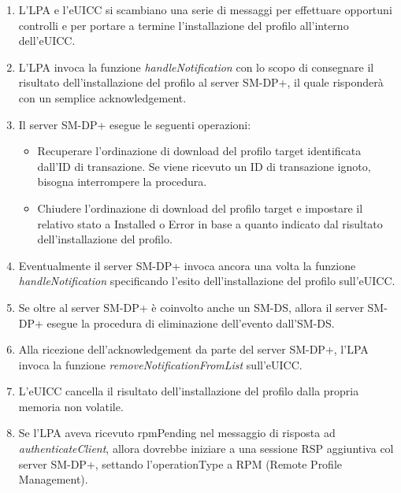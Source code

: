 \documentclass[10pt, oneside]{book}
\begin{document}
\begin{enumerate}
\item L'LPA e l'eUICC si scambiano una serie di messaggi per effettuare opportuni controlli e per portare a termine l'installazione del profilo all'interno dell'eUICC.
\item L'LPA invoca la funzione \textit{handleNotification} con lo scopo di consegnare il risultato dell'installazione del profilo al server SM-DP+, il quale risponderà con un semplice acknowledgement.
\item Il server SM-DP+ esegue le seguenti operazioni:
\begin{itemize}[itemsep=0pt]
\item Recuperare l'ordinazione di download del profilo target identificata dall'ID di transazione. Se viene ricevuto un ID di transazione ignoto, bisogna interrompere la procedura.
\item Chiudere l'ordinazione di download del profilo target e impostare il relativo stato a Installed o Error in base a quanto indicato dal risultato dell'installazione del profilo.
\end{itemize}
\item Eventualmente il server SM-DP+ invoca ancora una volta la funzione \textit{handleNotification} specificando l'esito dell'installazione del profilo sull'eUICC.
\item Se oltre al server SM-DP+ è coinvolto anche un SM-DS, allora il server SM-DP+ esegue la procedura di eliminazione dell'evento dall'SM-DS.
\item Alla ricezione dell'acknowledgement da parte del server SM-DP+, l'LPA invoca la funzione \textit{removeNotificationFromList} sull'eUICC.
\item L'eUICC cancella il risultato dell'installazione del profilo dalla propria memoria non volatile.
\item Se l'LPA aveva ricevuto rpmPending nel messaggio di risposta ad \textit{authenticateClient}, allora dovrebbe iniziare a una sessione RSP aggiuntiva col server SM-DP+, settando l'operationType a RPM (Remote Profile Management).
\end{enumerate}
\end{document}
